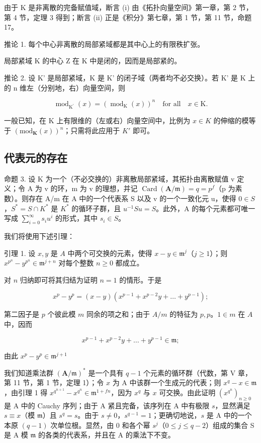 由于 K 是非离散的完备赋值域，断言 (i) 由《拓扑向量空间》第一章，第 2 节，第 4 节，定理 3 得到；断言 (ii) 正是《积分》第七章，第 1 节，第 11 节，命题 17。

推论 1. 每个中心非离散的局部紧域都是其中心上的有限秩扩张。

局部紧域 K 的中心 Z 在 K 中是闭的，因而是局部紧的。

推论 2. 设 K' 是局部紧域，K 是 K' 的闭子域（两者均不必交换）。若 K' 是 K 上的 n 维左（分别地，右）向量空间，则

\[
\operatorname{mod} _ {\mathrm{K} ^ {\prime}} (x) = (\operatorname{mod} _ {\mathrm{K}} (x)) ^ {n} \quad \text {for all} \quad x \in \mathrm{K}.\tag{2}
\]

一般已知，在 K 上有限维的（左或右）向量空间中，比例为 \(x \in K\) 的伸缩的模等于 \((\text{mod}_{\mathbf{K}}(x))^{n}\)；只需将此应用于 \(K'\) 即可。

\subsection{代表元的存在}

命题 3. 设 K 为一个（不必交换的）非离散局部紧域，其拓扑由离散赋值 v 定义；令 A 为 v 的环，m 为 v 的理想，并记 \(\operatorname{Card}(\mathbf{A}/\mathfrak{m}) = q = p^{f}\)（p 为素数）。则存在 A/m 在 A 中的一个代表系 S 以及 v 的一个一致化元 u，使得 \(0 \in S\)，\(S^{*} = S \cap K^{*}\) 是 \(K^{*}\) 的循环子群，且 \(u^{-1} Su = S\)。此外，A 的每个元素都可唯一写成 \(\sum_{i=0}^{\infty} s_{i} u^{i}\) 的形式，其中 \(s_{i} \in S\)。

我们将使用下述引理：

引理 1. 设 \(x, y\) 是 \(A\) 中两个可交换的元素，使得 \(x - y \in \mathfrak{m}^j\)（\(j \geqslant 1\)）；则 \(x^{p^n} - y^{p^n} \in \mathfrak{m}^{j + n}\) 对每个整数 \(n \geqslant 0\) 都成立。

对 \(n\) 归纳即可将其归结为证明 \(n = 1\) 的情形。于是

\[
x ^ {p} - y ^ {p} = (x - y) \left(x ^ {p - 1} + x ^ {p - 2} y + \dots + y ^ {p - 1}\right);
\]

第二因子是 \(p\) 个彼此模 \(m\) 同余的项之和；由于 \(A / m\) 的特征为 \(p, p\)。\(1 \in m\) 在 \(A\) 中，因而

\[
x ^ {p - 1} + x ^ {p - 2} y + \dots + y ^ {p - 1} \in \mathfrak {m};
\]

由此 \(x^{p} - y^{p}\in \mathfrak{m}^{j + 1}\)

我们知道乘法群 \((\mathbf{A} / \mathfrak{m})^*\) 是一个具有 \(q - 1\) 个元素的循环群（代数，第 V 章，第 11 节，第 1 节，定理 1）；令 \(x\) 为 A 中该群一个生成元的代表；则 \(x^{q} - x \in \mathfrak{m}\)，由引理 1 得 \(x^{q^{n + 1}} - x^{q^n} \in \mathfrak{m}^{1 + fn}\)，因为 \(x^{q}\) 与 \(x\) 可交换。由此证明 \((x^{q^n})_{n \geqslant 0}\) 是 A 中的 Cauchy 序列；由于 A 紧且完备，该序列在 A 中有极限 \(s\)，显然满足 \(s \equiv x\)（模 \(\mathfrak{m}\)）且 \(s^q = s\)。由于 \(s \neq 0\)，\(s^{q - 1} = 1\)；更确切地说，\(s\) 是 A 中的一个本原 \((q - 1)\) 次单位根。显然，由 0 和各个幂 \(s^j\)（\(0 \leqslant j \leqslant q - 2\)）组成的集合 S 是 A 模 \(\mathfrak{m}\) 的各类的代表系，并且在 A 的乘法下不变。

